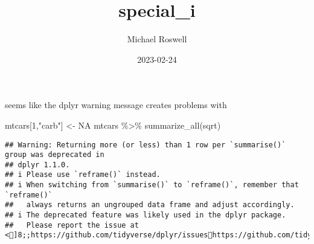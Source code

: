 \documentclass[
]{article}
\title{special\_i}
\author{Michael Roswell}
\date{2023-02-24}
\newenvironment{Shaded}{\begin{snugshade}}{\end{snugshade}}
\newcommand{\ConstantTok}[1]{\textcolor[rgb]{0.00,0.00,0.00}{#1}}
\newcommand{\DecValTok}[1]{\textcolor[rgb]{0.00,0.00,0.81}{#1}}
\newcommand{\FunctionTok}[1]{\textcolor[rgb]{0.00,0.00,0.00}{#1}}
\newcommand{\NormalTok}[1]{#1}
\newcommand{\OtherTok}[1]{\textcolor[rgb]{0.56,0.35,0.01}{#1}}
\newcommand{\SpecialCharTok}[1]{\textcolor[rgb]{0.00,0.00,0.00}{#1}}
\newcommand{\StringTok}[1]{\textcolor[rgb]{0.31,0.60,0.02}{#1}}
\begin{document}
\maketitle

seems like the dplyr warning message creates problems with

\begin{Shaded}
\begin{Highlighting}[]
\NormalTok{mtcars[}\DecValTok{1}\NormalTok{,}\StringTok{"carb"}\NormalTok{] }\OtherTok{\textless{}{-}} \ConstantTok{NA}
\NormalTok{mtcars }\SpecialCharTok{\%\textgreater{}\%} \FunctionTok{summarize\_all}\NormalTok{(sqrt)}
\end{Highlighting}
\end{Shaded}

\begin{verbatim}
## Warning: Returning more (or less) than 1 row per `summarise()` group was deprecated in
## dplyr 1.1.0.
## i Please use `reframe()` instead.
## i When switching from `summarise()` to `reframe()`, remember that `reframe()`
##   always returns an ungrouped data frame and adjust accordingly.
## i The deprecated feature was likely used in the dplyr package.
##   Please report the issue at <]8;;https://github.com/tidyverse/dplyr/issueshttps://github.com/tidyverse/dplyr/issues]8;;>.
\end{verbatim}
\end{document}
